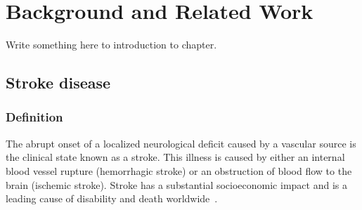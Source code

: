 
%

\chapter{Background and Related Work}
\label{cha:users_manual}

\glsresetall


Write something here to introduction to chapter.

\section{Stroke disease}
\label{sec:introduction}

\subsection{Definition}
\label{sec:definitionStroke}
The abrupt onset of a localized neurological deficit caused by a vascular source is the clinical state known as a stroke. This illness is caused by either an internal blood vessel rupture (hemorrhagic stroke) or an obstruction of blood flow to the brain (ischemic stroke). Stroke has a substantial socioeconomic impact and is a leading cause of disability and death worldwide~\cite{Stroke}.

